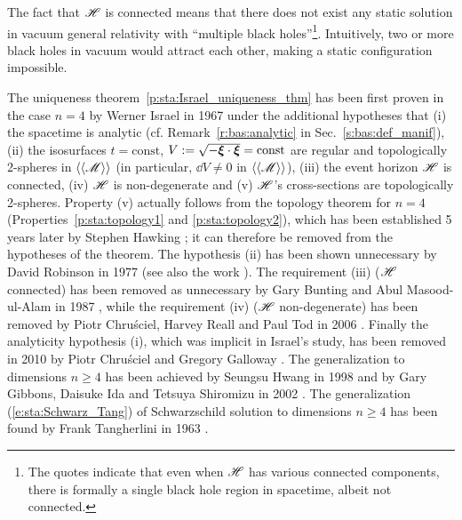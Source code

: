 \begin{remark}
The fact that $\mathscr{H}$ is connected means that there does not exist any
static solution in vacuum general relativity with ``multiple black holes''\footnote{The quotes indicate that even when $\mathscr{H}$ has various connected components, there is
formally a single black hole region in spacetime, albeit not connected.}.
Intuitively, two or more black holes in vacuum would attract each other, making a static configuration impossible.
\end{remark}

\begin{hist}
\label{h:sta:Israel_thm_vacuum}
The uniqueness theorem~\ref{p:sta:Israel_uniqueness_thm}
has been first proven in the case $n=4$ by Werner Israel
in 1967 \cite{Israe67}
under the additional hypotheses that (i) the spacetime is analytic
(cf. Remark~\ref{r:bas:analytic} in Sec.~\ref{s:bas:def_manif}),
(ii) the isosurfaces $t=\mathrm{const}$, $V := \sqrt{-\bm{\xi}\cdot\bm{\xi}} = \mathrm{const}$
are regular and topologically 2-spheres in $\langle\langle \mathscr{M}\rangle\rangle$
(in particular, $\dd V \neq 0$ in $\langle\langle \mathscr{M}\rangle\rangle$),
(iii) the event horizon $\mathscr{H}$ is connected,
(iv) $\mathscr{H}$ is non-degenerate
and (v) $\mathscr{H}$'s cross-sections are topologically 2-spheres.
Property (v)
actually follows from the topology theorem for $n=4$ (Properties~\ref{p:sta:topology1}
and \ref{p:sta:topology2}), which has been established 5 years later by Stephen Hawking \cite{Hawki72}; it can therefore be removed from the hypotheses of the theorem.
The hypothesis (ii) has been shown unnecessary by David Robinson
in 1977 \cite{Robin77}
(see also the work \cite{MulleRS73}).
The requirement (iii) ($\mathscr{H}$ connected)
has been removed as unnecessary by Gary Bunting and
Abul Masood-ul-Alam in 1987 \cite{BuntiM87}, while the requirement (iv)
($\mathscr{H}$ non-degenerate) has been removed by
Piotr Chru\'sciel,
Harvey Reall and Paul Tod in 2006 \cite{ChrusRT06}.
Finally the analyticity hypothesis (i), which was implicit in Israel's study, has
been removed in 2010 by
Piotr Chru\'sciel and
Gregory Galloway \cite{ChrusG10}. The generalization to
dimensions $n\geq 4$ has been achieved by Seungsu Hwang in 1998 \cite{Hwang98}
and by Gary Gibbons, Daisuke Ida
and Tetsuya Shiromizu in 2002 \cite{GibboIS02b}.
The generalization (\ref{e:sta:Schwarz_Tang}) of Schwarzschild solution to dimensions
$n\geq 4$ has been found by
Frank Tangherlini in 1963 \cite{Tangh63}.
\end{hist}

